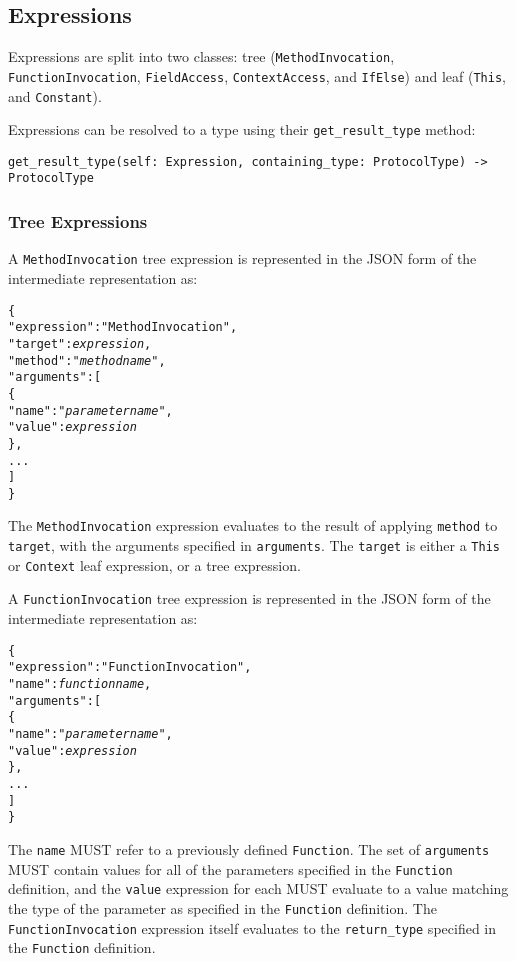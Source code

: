 \documentclass[10pt,twocolumn,a4paper]{article}
\newcommand{\code}[1]{\texttt{#1}}
\begin{document}
\subsection{Expressions}
\label{sec:expressions}

Expressions are split into two classes: 
tree (\code{MethodInvocation}, \code{FunctionInvocation}, \code{FieldAccess}, 
      \code{ContextAccess}, and \code{IfElse})
and 
leaf (\code{This}, and \code{Constant}).

Expressions can be resolved to a type using their \code{get\_result\_type} method:

\code{get\_result\_type(self: Expression, containing\_type: ProtocolType) -> ProtocolType}

\subsubsection{Tree Expressions}

A \code{MethodInvocation} tree expression is represented in the JSON form of the
intermediate representation as:
\footnotesize
\begin{alltt}
  \{
    "expression"   : "MethodInvocation",
    "target"       : \emph{expression},
    "method"       : "\emph{method name}",
    "arguments"    : [
      \{
        "name"  : "\emph{parameter name}",
        "value" : \emph{expression}
      \},
      ...
    ]
  \}
\end{alltt}
\normalsize
The \code{MethodInvocation} expression evaluates to the result of applying \code{method}
to \code{target}, with the arguments specified in \code{arguments}. The \code{target} is
either a \code{This} or \code{Context} leaf expression, or a tree expression.

A \code{FunctionInvocation} tree expression is represented in the JSON form of the
intermediate representation as:
\footnotesize
\begin{alltt}
  \{
    "expression"   : "FunctionInvocation",
    "name"         : \emph{function name},
    "arguments"    : [
      \{
        "name"  : "\emph{parameter name}",
        "value" : \emph{expression}
      \},
      ...
    ]
  \}
\end{alltt}
\normalsize
The \code{name} MUST refer to a previously defined \code{Function}. The set
of \code{arguments} MUST contain values for all of the parameters specified
in the \code{Function} definition, and the \code{value} expression for each
MUST evaluate to a value matching the type of the parameter as specified in
the \code{Function} definition. The \code{FunctionInvocation} expression
itself evaluates to the \code{return\_type} specified in the
\code{Function} definition.
\end{document}
